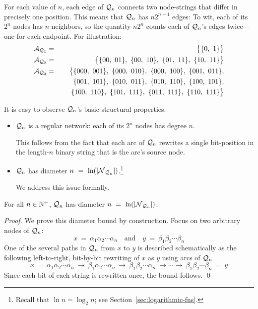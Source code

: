 \begin{itemize}
For each value of $n$, each edge of $\mbox{$\cal Q$}_n$ connects two node-strings
that differ in precisely one position.  This means that $\mbox{$\cal Q$}_n$ has $n
2^{n-1}$ edges: To wit, each of its $2^n$ nodes has $n$ neighbors, so
the quantity $n 2^n$ counts each of $\mbox{$\cal Q$}_n$'s edges twice---one for
each endpoint.  For illustration:
\begin{eqnarray*}
\mbox{$\cal A$}_{{\mbox{{\scriptsize $\cal Q$}}}_1}
  & = &
\big\{ \{ 0, \ 1 \} \big\} \\
\mbox{$\cal A$}_{{\mbox{{\scriptsize $\cal Q$}}}_2}
  & = & \big\{
\{ 00, \ 01 \}, \ \{ 00, \ 10\}, \
\{ 01, \ 11 \}, \ \{ 10, \ 11\} 
\big\} \\
\mbox{$\cal A$}_{{\mbox{{\scriptsize $\cal Q$}}}_3}
  & = & \big\{ 
\{000, \ 001\}, \
\{000, \ 010\}, \
\{000, \ 100\}, \
\{001, \ 011\}, \\
  &  & \hspace*{.2in}
\{001, \ 101\}, \
\{010, \ 011\}, \
\{010, \ 110\}, \
\{100, \ 101\}, \\
  &  & \hspace*{.2in}
\{100, \ 110\}, \
\{101, \ 111\}, \
\{011, \ 111\}, \
\{110, \ 111\}
\big\}
\end{eqnarray*}
\end{itemize}

\medskip

\noindent
It is easy to observe $\mbox{$\cal Q$}_n$'s basic structural properties.
\begin{itemize}
\item {}
$\mbox{$\cal Q$}_n$ is a regular network: each of its $2^n$ nodes has degree $n$.

This follows from the fact that each arc of $\mbox{$\cal Q$}_n$ rewrites a single
bit-position in the length-$n$ binary string that is the arc's source
node.

\item {}
$\mbox{$\cal Q$}_n$ has diameter $n \ = \ \ln(|\mbox{$\cal N$}_{\mbox{{\scriptsize $\cal Q$}}_n}|)$.\footnote{Recall that
  $\ln n = \log_2 n$; see Section~\ref{sec:logarithmic-fns}.}

We address this issue formally.
\end{itemize}

\begin{prop}
\label{thm:hypercube-diameter}
For all $n \in \mathbb{N}^+$, $\mbox{$\cal Q$}_n$ has diameter $n \ = \ \ln(|\mbox{$\cal N$}_{\mbox{{\scriptsize $\cal Q$}}_n}|)$.
\end{prop}

\begin{proof}
We prove this diameter bound by construction.  Focus on two arbitrary
nodes of $\mbox{$\cal Q$}_n$:
\[ x \ = \ \alpha_1 \alpha_2 \cdots \alpha_n \ \ \ \mbox{ and } \ \ \
y \ = \ \beta_1 \beta_2 \cdots \beta_n
\]
One of the several paths in $\mbox{$\cal Q$}_n$ from $x$ to $y$ is described
schematically as the following left-to-right, bit-by-bit rewriting of
$x$ as $y$ using arcs of $\mbox{$\cal Q$}_n$
\[
x \ = \ \alpha_1 \alpha_2 \cdots \alpha_n \ \rightarrow \
\beta_1 \alpha_2 \cdots \alpha_n \ \rightarrow \
\beta_1 \beta_2\cdots \alpha_n \ \rightarrow \cdots \rightarrow\ 
\beta_1 \beta_2 \cdots \beta_n \ = \ y
\]
Since each bit of each string is rewritten once, the bound follows.
\qed
\end{proof}

